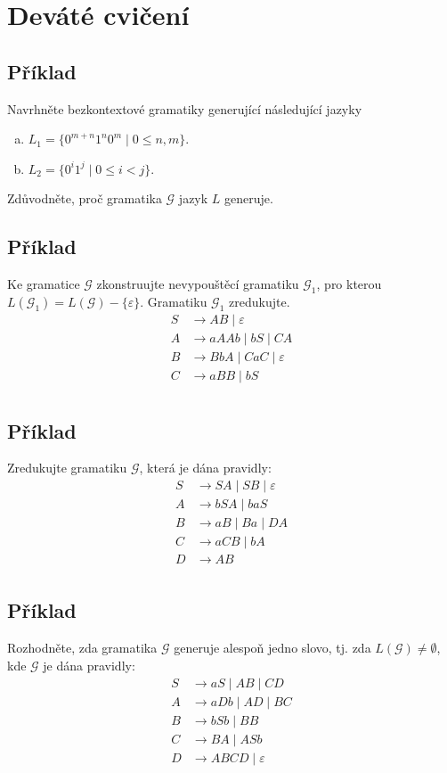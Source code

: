 \section{Deváté cvičení}

\subsection{Příklad}
Navrhněte bezkontextové gramatiky generující následující jazyky
\begin{enumerate}[a), noitemsep]
    \item $L_1 = \{0^{m+n} 1^n 0^m \mid 0 \leq n,m\}$.
    \item $L_2 = \{0^i 1^j \mid 0 \leq i < j\}$.
\end{enumerate}
Zdůvodněte, proč gramatika $\mathcal{G}$ jazyk $L$ generuje.

\subsection{Příklad}
Ke gramatice $\mathcal{G}$ zkonstruujte nevypouštěcí gramatiku $\mathcal{G}_1$, pro kterou 
$L(\mathcal{G}_1) = L(\mathcal{G}) - \{\varepsilon\}$. Gramatiku $\mathcal{G}_1$ zredukujte.
\begin{align*}
    S & \rightarrow AB \mid \varepsilon \\
    A & \rightarrow aAAb \mid bS \mid CA \\
    B & \rightarrow BbA \mid CaC \mid \varepsilon \\ 
    C & \rightarrow aBB \mid bS \\
\end{align*}

\subsection{Příklad}
Zredukujte gramatiku $\mathcal{G}$, která je dána pravidly:
\begin{align*}
    S & \rightarrow SA \mid SB \mid \varepsilon \\
    A & \rightarrow bSA \mid baS \\
    B & \rightarrow aB \mid Ba \mid DA \\ 
    C & \rightarrow aCB \mid bA \\
    D & \rightarrow AB \\
\end{align*}

\subsection{Příklad}
Rozhodněte, zda gramatika $\mathcal{G}$ generuje alespoň jedno slovo, tj. zda $L(\mathcal{G}) \not= \emptyset$, kde 
$\mathcal{G}$ je dána pravidly:
\begin{align*}
    S & \rightarrow aS \mid AB \mid CD \\
    A & \rightarrow aDb \mid AD \mid BC \\
    B & \rightarrow bSb \mid BB \\ 
    C & \rightarrow BA \mid ASb \\
    D & \rightarrow ABCD \mid \varepsilon\\
\end{align*}


